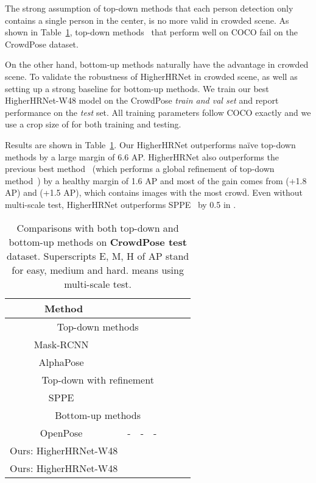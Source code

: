 \documentclass[10pt,twocolumn,letterpaper]{article}
\begin{document}
The strong assumption of top-down methods that each person detection only contains a single person in the center, is no more valid in crowded scene. As shown in Table~\ref{tab:crowd_pose_test}, top-down methods~\cite{he2017mask,fang2017rmpe} that perform well on COCO fail on the CrowdPose dataset.

On the other hand, bottom-up methods naturally have the advantage in crowded scene. To validate the robustness of HigherHRNet in crowded scene, as well as setting up a strong baseline for bottom-up methods. We train our best HigherHRNet-W48 model on the CrowdPose \textit{train and val set} and report performance on the \textit{test} set. All training parameters follow COCO exactly and we use a crop size of  for both training and testing.

Results are shown in Table~\ref{tab:crowd_pose_test}. Our HigherHRNet outperforms na\"ive top-down methods by a large margin of 6.6 AP. HigherHRNet also outperforms the previous best method~\cite{li2019crowdpose} (which performs a global refinement of top-down method~\cite{fang2017rmpe}) by a healthy margin of 1.6 AP and most of the gain comes from  (+1.8 AP) and  (+1.5 AP), which contains images with the most crowd. Even without multi-scale test, HigherHRNet outperforms SPPE~\cite{li2019crowdpose} by 0.5 in .

\begin{table}[t]
    \centering
    \footnotesize
    \setlength{\tabcolsep}{2.0pt}
    \begin{tabular}{c|c|c|c|c|c|c}
    Method &   &  &  &  &  & \\
    \hline
    \multicolumn{7}{c}{Top-down methods}\\
    \hline
    Mask-RCNN~\cite{he2017mask}&  &  &  &  &  &  \\
    AlphaPose~\cite{fang2017rmpe} &  &  &  &  &  &  \\
    \hline
    \multicolumn{7}{c}{Top-down with refinement}\\
    \hline
    SPPE~\cite{li2019crowdpose} &  &  &  &  &  &  \\
    \hline
    \multicolumn{7}{c}{Bottom-up methods}\\
    \hline
    OpenPose~\cite{cao2017realtime} & - & - & - &  &  &  \\
    Ours: HigherHRNet-W48 &  &  &  &  &  &  \\
    Ours: HigherHRNet-W48 &  &  &  &  &  &  \\
    \end{tabular}\vspace{2mm}
    \caption{Comparisons with both top-down and bottom-up methods on \textbf{CrowdPose test} dataset. Superscripts E, M, H of AP stand for easy, medium and hard.  means using multi-scale test.
    } 
    \label{tab:crowd_pose_test}
    \vspace{-2mm}
\end{table}
\end{document}
